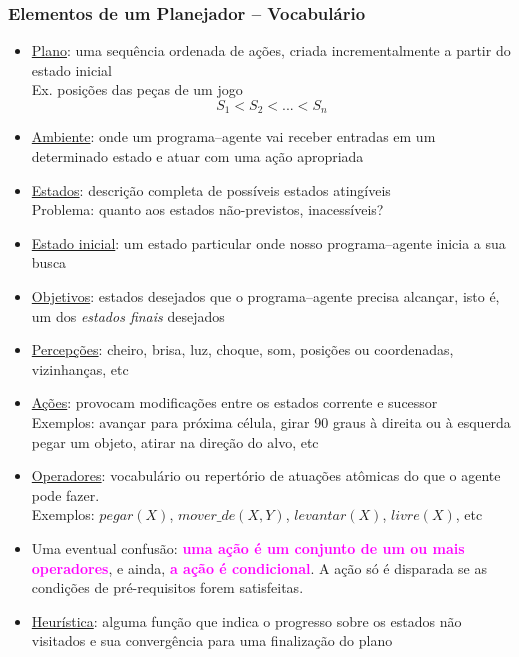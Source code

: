 \begin{frame}[fragile, allowframebreaks=0.9]
\frametitle{Elementos de um  Planejador -- Vocabulário}


\begin{itemize}
 \item \underline{Plano}: uma sequência ordenada de ações, 
 criada incrementalmente a partir do estado inicial\\
Ex. posições das peças de um jogo\\
$$S_1 < S_2 < ... < S_n$$
 
  \item \underline{Ambiente}: onde um programa--agente vai receber entradas em um determinado
  estado e atuar com uma ação apropriada

  \item  \underline{Estados}:   descrição completa de possíveis estados atingíveis\\
  Problema: quanto aos estados não-previstos, inacessíveis?

  \item  \underline{Estado inicial}: um estado particular onde nosso programa--agente
  inicia a sua busca
  
  \item \underline{Objetivos}: estados desejados que o programa--agente precisa alcançar,
  isto é, um dos \textit{estados finais} desejados

  \item  \underline{Percepções}: cheiro, brisa, luz, choque,
  som, posições ou coordenadas, vizinhanças, etc

  \item \underline{Ações}: provocam modificações entre os estados corrente e sucessor\\
  Exemplos: avançar para próxima célula, girar 90 graus à direita ou à esquerda
pegar um objeto, atirar na direção do alvo, etc
 
 \item \underline{Operadores}: vocabulário ou repertório de atuações atômicas do que o agente pode fazer.\\
 Exemplos: $pegar(X)$, $mover\_de(X,Y)$, $levantar(X)$, $livre(X)$, etc
 
 \item Uma eventual confusão: \textcolor{magenta}{\textbf{uma ação é um conjunto de um ou mais operadores}},
 e ainda, \textcolor{magenta}{\textbf{a ação é condicional}}. 
 A ação só é disparada se as condições de pré-requisitos forem 
 satisfeitas.
 
 \item \underline{Heurística}: alguma função que  indica o progresso sobre os estados
 não visitados e sua convergência para uma finalização do plano
 
 
\end{itemize}

\end{frame}



